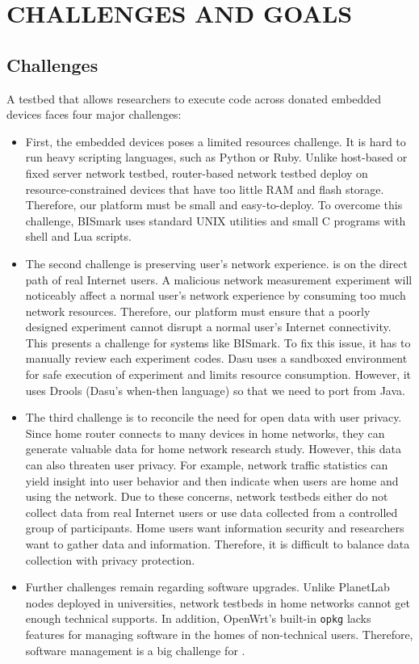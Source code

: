 \chapter{CHALLENGES AND GOALS}
\label{sec.goals_challenges}
\section{Challenges}
\label{ssec.challenges}
A testbed that allows researchers to execute code across donated embedded devices faces four major challenges: 
\begin{itemize}
\item First, the embedded devices poses a limited resources challenge. It is hard to run heavy scripting languages, such as Python or Ruby. Unlike host-based or fixed server network testbed, router-based network testbed deploy on resource-constrained devices that have too little RAM and flash storage. Therefore, our platform must be small and easy-to-deploy. To overcome this challenge, BISmark uses standard UNIX utilities and small C programs with shell and Lua scripts.  
\item The second challenge is preserving user's network experience. \sysname is on the direct path of real Internet users. A malicious network measurement experiment will noticeably affect a normal user's network experience by consuming too much network resources. Therefore, our platform must ensure that a poorly designed experiment cannot disrupt a normal user's Internet connectivity. This presents a challenge for systems like BISmark. To fix this issue, it has to manually review each experiment codes. Dasu uses a sandboxed environment for safe execution of experiment and limits resource consumption. However, it uses Drools (Dasu's when-then language) so that we need to port from Java.
\item The third challenge is to reconcile the need for open data with user privacy. Since home router connects to many devices in home networks, they can generate valuable data for home network research study. However, this data can also threaten user privacy. For example, network traffic statistics can yield insight into user behavior and then indicate when users are home and using the network. Due to these concerns, network testbeds either do not collect data from real Internet users or use data collected from a controlled group of participants. Home users want information security and researchers want to gather data and information. Therefore, it is difficult to balance data collection with privacy protection.
\item Further challenges remain regarding software upgrades. Unlike PlanetLab nodes deployed in universities, network testbeds in home networks cannot get enough technical supports. In addition, OpenWrt's built-in \texttt{opkg} lacks features for managing software in the homes of non-technical users. Therefore, software management is a big challenge for \sysname.  
\end{itemize}
